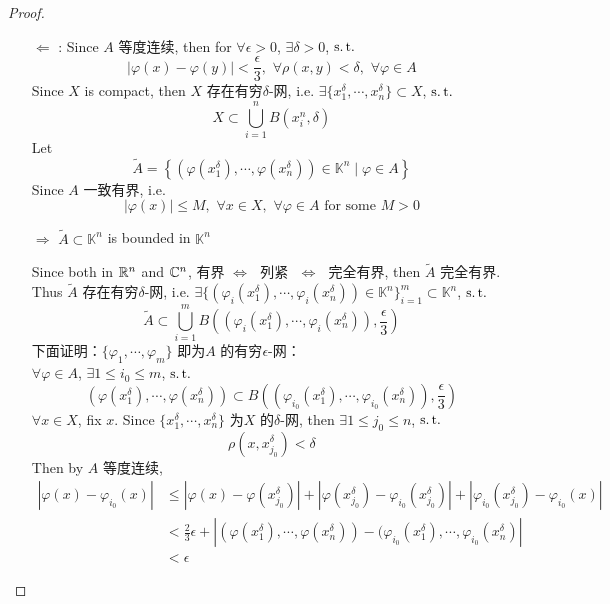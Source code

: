 \begin{thm}
\begin{proof}
\begin{enumerate}
				\item[$\Leftarrow$]: Since $A$ 等度连续, then for $\forall \epsilon > 0$, $\exists \delta > 0$, $\operatorname{s.t.}$
				\[ \left| \varphi(x) - \varphi(y) \right| < \frac{\epsilon}{3} , \,\, \forall \rho(x , y) < \delta , \,\, \forall \varphi \in A \]
				Since $X$ is compact, then $X$ 存在有穷$\delta$-网, i.e. $\exists \{ x_{1}^\delta , \cdots , x_{n}^\delta \} \subset X$, $\operatorname{s.t.}$
				\[ X \subset \bigcup_{i = 1}^{n} B(x_{i}^n , \delta) \]
				Let
				\[ \widetilde{A} = \left\{ \left( \varphi(x_{1}^\delta) , \cdots , \varphi(x_{n}^\delta) \right) \in \mathbb{K}^n \mid \varphi \in A \right\} \]
				Since $A$ 一致有界, i.e. 
				\[ \left| \varphi(x) \right| \leq M , \,\, \forall x \in X , \,\, \forall \varphi \in A \,\, \text{for some} \,\, M > 0 \]
				\begin{center}
					$\Rightarrow \,\, \widetilde{A} \subset \mathbb{K}^n$ is bounded in $\mathbb{K}^n$
				\end{center}
				Since both in $\mathbb{R}^n$ and $\mathbb{C}^n$, 有界$\,\, \Leftrightarrow \,\,$ 列紧 $\,\, \Leftrightarrow \,\,$ 完全有界, then $\widetilde{A}$ 完全有界. \\
				Thus $\widetilde{A}$ 存在有穷$\delta$-网, i.e. $\exists \{ ( \varphi_{i}(x_{1}^\delta) , \cdots , \varphi_{i}(x_{n}^\delta) ) \in \mathbb{K}^n \}_{i = 1}^{m} \subset \mathbb{K}^n$, $\operatorname{s.t.}$
				\[ \widetilde{A} \subset \bigcup_{i = 1}^{m} B( ( \varphi_{i}(x_{1}^\delta) , \cdots , \varphi_{i}(x_{n}^\delta) ) , \frac{\epsilon}{3}) \]
				下面证明：$\{ \varphi_1 , \cdots , \varphi_m \}$ 即为$A$ 的有穷$\epsilon$-网：\\
				$\forall \varphi \in A$, $\exists 1 \leq i_0 \leq m$, $\operatorname{s.t.}$
				\[ ( \varphi(x_{1}^\delta) , \cdots , \varphi(x_{n}^\delta) ) \subset B( ( \varphi_{i_0}(x_{1}^\delta) , \cdots , \varphi_{i_0}(x_{n}^\delta) ) , \frac{\epsilon}{3}) \]
				$\forall x \in X$, fix $x$. Since $\{ x_{1}^\delta , \cdots , x_{n}^\delta \}$ 为$X$ 的$\delta$-网, then $\exists 1 \leq j_0 \leq n$, $\operatorname{s.t.}$
				\[ \rho(x , x_{j_0}^\delta) < \delta \]
				Then by $A$ 等度连续, 
				\begin{align}
					\left| \varphi(x) - \varphi_{i_0}(x) \right| 
					&\leq \left| \varphi(x) - \varphi(x_{j_0}^\delta) \right| + \left| \varphi(x_{j_0}^\delta) - \varphi_{i_0}(x_{j_0}^\delta) \right| + \left| \varphi_{i_0}(x_{j_0}^\delta) - \varphi_{i_0}(x) \right| \\
					&< \frac{2}{3} \epsilon + \left| ( \varphi(x_{1}^\delta) , \cdots , \varphi(x_{n}^\delta) ) - ( \varphi_{i_0}(x_{1}^\delta) , \cdots , \varphi_{i_0}(x_{n}^\delta) \right| \\
					&< \epsilon
				\end{align}
			\end{enumerate}
		\end{proof}
	\end{thm}


	\ifx\allfiles\undefined

\fi